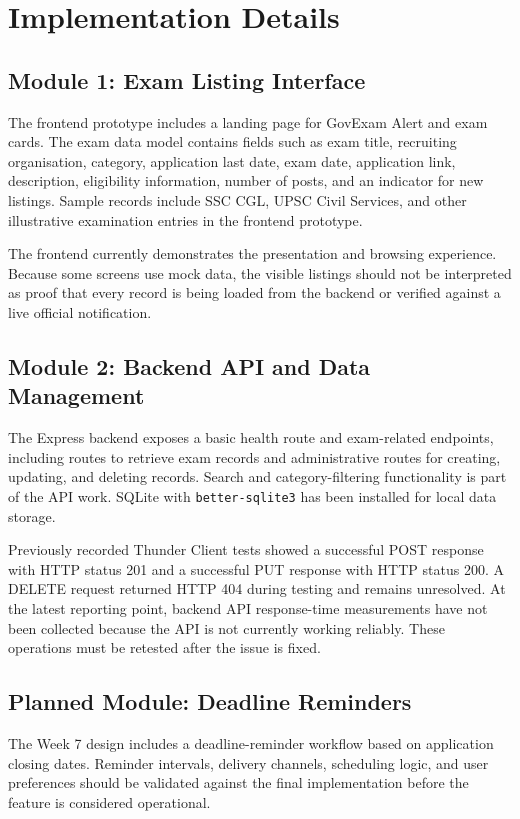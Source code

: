 \documentclass[12pt,a4paper]{report}
\begin{document}
\section{Implementation Details}
\subsection{Module 1: Exam Listing Interface}
The frontend prototype includes a landing page for GovExam Alert and exam cards. The exam data model contains fields such as exam title, recruiting organisation, category, application last date, exam date, application link, description, eligibility information, number of posts, and an indicator for new listings. Sample records include SSC CGL, UPSC Civil Services, and other illustrative examination entries in the frontend prototype.

The frontend currently demonstrates the presentation and browsing experience. Because some screens use mock data, the visible listings should not be interpreted as proof that every record is being loaded from the backend or verified against a live official notification.

\subsection{Module 2: Backend API and Data Management}
The Express backend exposes a basic health route and exam-related endpoints, including routes to retrieve exam records and administrative routes for creating, updating, and deleting records. Search and category-filtering functionality is part of the API work. SQLite with \texttt{better-sqlite3} has been installed for local data storage.

Previously recorded Thunder Client tests showed a successful POST response with HTTP status 201 and a successful PUT response with HTTP status 200. A DELETE request returned HTTP 404 during testing and remains unresolved. At the latest reporting point, backend API response-time measurements have not been collected because the API is not currently working reliably. These operations must be retested after the issue is fixed.

\subsection{Planned Module: Deadline Reminders}
The Week 7 design includes a deadline-reminder workflow based on application closing dates. Reminder intervals, delivery channels, scheduling logic, and user preferences should be validated against the final implementation before the feature is considered operational.
\end{document}
